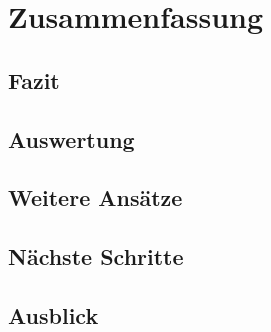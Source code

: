 \chapter{Zusammenfassung}
\label{sec:zusammenfassung}

\section{Fazit}

\section{Auswertung}

\section{Weitere Ansätze}

\section{Nächste Schritte}

\section{Ausblick}
